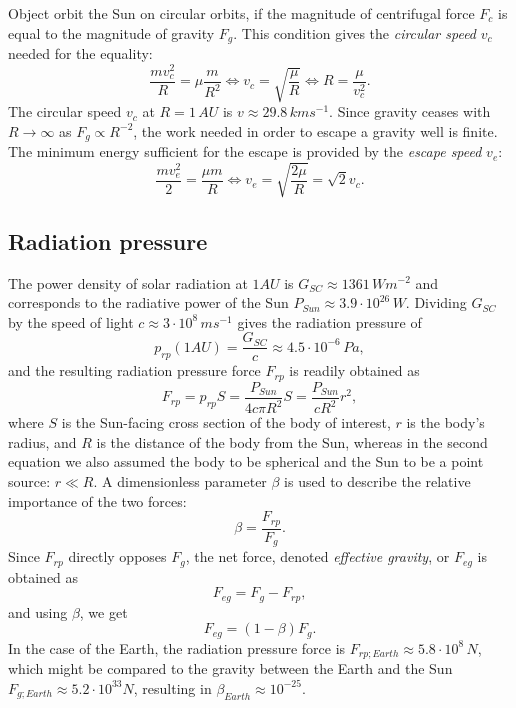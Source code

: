 Object orbit the Sun on circular orbits, if the magnitude of centrifugal force $F_c$ is equal to the magnitude of gravity $F_g$. This condition gives the \textit{circular speed} $v_c$ needed for the equality: 
\begin{equation}
    \frac{m v_c^2}{R} = \mu \frac{m}{R^2} \Leftrightarrow v_c = \sqrt{\frac{\mu}{R}} \Leftrightarrow R = \frac{\mu}{v_c^2}.
    \label{eq:circular_speed}
\end{equation}
The circular speed $v_c$ at $R = 1 \, \si{AU}$ is $v \approx 29.8 \, \si{km s^{-1}}$. Since gravity ceases with $R \to \infty$ as $F_g \propto R^{-2}$, the work needed in order to escape a gravity well is finite. The minimum energy sufficient for the escape is provided by the \textit{escape speed} $v_e$: 
\begin{equation}
    \frac{m v_e^2}{2} = \frac{\mu m}{R} \Leftrightarrow v_e = \sqrt{\frac{2 \mu}{R}} = \sqrt{2} v_c.
    \label{eq:escape_speed}
\end{equation}

\subsection{Radiation pressure}

The power density of solar radiation at $1 \si{AU}$ is $G_{SC} \approx 1361 \, \si{W m^{-2}}$ \citep{kopp2011new} and corresponds to the radiative power of the Sun $P_{Sun} \approx 3.9 \cdot 10^{26} \, \si{W}$. Dividing $G_{SC}$ by the speed of light $c \approx 3\cdot10^8 \, \si{m s^{-1}}$ gives the radiation pressure of
\begin{equation}
    p_{rp}(1 \si{AU}) = \frac{G_{SC}}{c} \approx 4.5 \cdot 10^{-6} \, \si{Pa},
    \label{eq:radiation_pressure}
\end{equation}
and the resulting radiation pressure force $F_{rp}$ is readily obtained as
\begin{equation}
    F_{rp} = p_{rp} S = \frac{P_{Sun}}{4 c \pi R^2} S = \frac{P_{Sun}}{cR^2} r^2, \label{eq:radiation_pressure_force}
\end{equation}
where $S$ is the Sun-facing cross section of the body of interest, $r$ is the body's radius, and $R$ is the distance of the body from the Sun, whereas in the second equation we also assumed the body to be spherical and the Sun to be a point source: $r \ll R$. A dimensionless parameter $\beta$ is used to describe the relative importance of the two forces:
\begin{equation}
    \beta = \frac{F_{rp}}{F_g}.
\end{equation}
Since $F_{rp}$ directly opposes $F_g$, the net force, denoted \textit{effective gravity}, or $F_{eg}$ is obtained as
\begin{equation}
    F_{eg} = F_g - F_{rp},
\end{equation}
and using $\beta$, we get
\begin{equation}
    F_{eg} = (1-\beta) F_g.
\end{equation}
In the case of the Earth, the radiation pressure force is $F_{rp;Earth} \approx 5.8 \cdot 10^8 \, \si{N}$, which might be compared to the gravity between the Earth and the Sun $F_{g;Earth} \approx 5.2 \cdot 10^{33} \si{N}$, resulting in $\beta_{Earth} \approx 10^{-25}$. 


